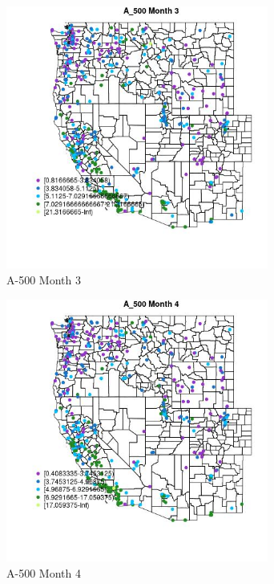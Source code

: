 \begin{figure} 
\centering  
\includegraphics[width=0.77\textwidth]{Code_Outputs/ML_input_report_ML_input_PM25_Step5_part_d_de_duplicated_aves_ML_input_MapObsMo3A_500.jpg} 
\caption{\label{fig:ML_input_report_ML_input_PM25_Step5_part_d_de_duplicated_aves_ML_inputMapObsMo3A_500}A-500 Month 3} 
\end{figure} 
 

\begin{figure} 
\centering  
\includegraphics[width=0.77\textwidth]{Code_Outputs/ML_input_report_ML_input_PM25_Step5_part_d_de_duplicated_aves_ML_input_MapObsMo4A_500.jpg} 
\caption{\label{fig:ML_input_report_ML_input_PM25_Step5_part_d_de_duplicated_aves_ML_inputMapObsMo4A_500}A-500 Month 4} 
\end{figure} 
 

